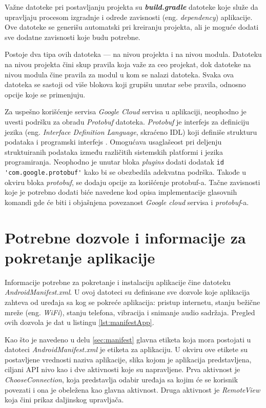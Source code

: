 \documentclass[implementacija.tex]{subfiles}
\begin{document}
Važne datoteke pri postavljanju projekta su \textbf{\textit{build.gradle}} datoteke koje služe da  upravljaju procesom izgradnje i odrede zavisnosti (eng. \textit{dependency}) aplikacije. Ove datoteke se generišu automatski pri kreiranju projekta, ali je moguće dodati sve dodatne zavisnosti koje budu potrebne.

Postoje dva tipa ovih datoteka --- na nivou projekta i na nivou modula. Datoteku na nivou projekta čini skup pravila koja važe za ceo projekat, dok datoteke na nivou modula čine pravila za modul u kom se nalazi datoteka. Svaka ova datoteka se sastoji od više blokova koji grupišu unutar sebe pravila, odnosno opcije koje se primenjuju.

Za uspešno korišćenje servisa \textit{Google Cloud} servisa u aplikaciji, neophodno je uvesti podršku za obradu \textit{Protobuf} datoteka. \textit{Protobuf} je interfejs za definiciju jezika (eng. \textit{Interface Definition Language}, skraćeno IDL) koji definiše strukturu podataka i programski interfejs \cite{sajt:protobuf}. Omogućava usaglašeost pri deljenju struktuiranih podataka između različitih sistemskih platformi i jezika programiranja. Neophodno je unutar bloka \textit{plugins} dodati dodatak \verb|id 'com.google.protobuf'| kako bi se obezbedila adekvatna podrška. Takođe u okviru bloka \textit{protobuf}, se dodaju opcije za korišćenje protobuf-a. Tačne zavisnosti koje je potrebno dodati biće navedene kod opisa implementacije glasovnih komandi gde će biti i objašnjena povezanost \textit{Google cloud} servisa i \textit{protobuf}-a.

\section{Potrebne dozvole i informacije za pokretanje aplikacije}

Informacije potrebne za pokretanje i instalaciju aplikacije čine datoteku \textit{AndroidManifest.xml}. U ovoj datoteci su definisane sve dozvole koje aplikacija zahteva od uređaja sa kog se pokreće aplikacija: pristup internetu, stanju bežične mreže (eng. \textit{WiFi}), stanju telefona, vibracija i  snimanje audio sadržaja. Pregled ovih dozvola je dat u listingu \ref{lst:manifestApp}.

Kao što je navedeno u delu \ref{sec:manifest} glavna etiketa koja mora postojati u datoteci \textit{AndroidManifest.xml} je etiketa za aplikaciju. U okviru ove etikete su postavljene vrednosti naziva aplikacije, slika kojom je aplikacija predstavljena, ciljani API nivo kao i dve aktivnosti koje su napravljene. Prva aktivnost je \textit{ChooseConnection}, koja predstavlja odabir uređaja sa kojim će se korisnik povezati i ona je obeležena kao glavna aktivnost. Druga aktivnost je \textit{RemoteView} koja čini prikaz daljinskog upravljača. 
\end{document}

